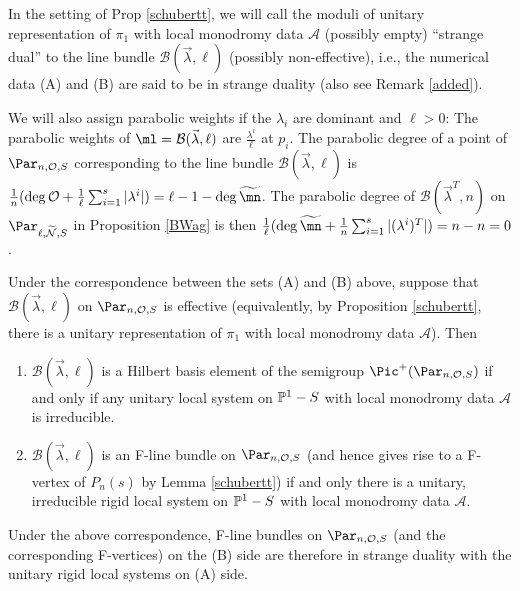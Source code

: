 \begin{defi}
\notready\label{Shosta}
In the setting of Prop \ref{schubertt}, we will call the moduli of unitary representation of $\pi_1$ with local monodromy data $\mathcal{A}$ (possibly empty)  ``strange dual'' to  the line bundle  $\mathcal{B}(\vec{\lambda},\ell)$ (possibly non-effective), i.e., the numerical data (A) and (B) are said to be in strange duality (also see Remark \ref{added}).

\end{defi}
\begin{defi}
\notready\label{amirK}
We will also assign parabolic weights if the $\lambda_i$ are dominant and $\ell>0$: The parabolic weights of $\ml=\mathcal{B}(\vec{\lambda},{\ell})$ are $\frac{{\lambda^i}}{\ell}$ at $p_i$. The parabolic degree of a point of $\Par_{n,\mathcal{O},S}$ corresponding to the line bundle  $\mathcal{B}(\vec{\lambda},{\ell})$ is $\frac{1}{n}(\deg{\mathcal{O}}+\frac{1}{\ell}\sum_{i=1}^s|\lambda^i|)=\ell-1-\deg\widetilde{\mn}$. The parabolic degree of $\mathcal{B}(\vec{\lambda}^T,n)$ on $\Par_{\ell,\widetilde{\mathcal{N}},S}$ in Proposition \ref{BWag} is then $\frac{1}{\ell}(\deg{\widetilde{\mn}}+\frac{1}{n}\sum_{i=1}^s|(\lambda^i)^T|) =n-n=0$.
\end{defi}

\begin{theorem}
\notready\label{christmas}
Under the correspondence between the sets (A) and (B) above, suppose that $\mathcal{B}(\vec{\lambda},\ell)$ on $\Par_{n,{\mathcal{O}},S}$ is effective (equivalently, by Proposition \ref{schubertt}, there is a unitary representation of $\pi_1$ with  local monodromy data $\mathcal{A}$). Then
\begin{enumerate}
\item[(i)] $\mathcal{B}(\vec{\lambda},\ell)$ is a Hilbert basis element of  the semigroup $\Pic^+(\Par_{n,\mathcal{O},S})$ if and only if
any unitary local system on $\Bbb{P}^1-S$ with local monodromy data $\mathcal{A}$ is  irreducible.
\item[(ii)] $\mathcal{B}(\vec{\lambda},\ell)$ is an F-line bundle on   $\Par_{n,\mathcal{O},S}$ (and hence gives rise to a F-vertex of $P_n(s)$ by Lemma \ref{schubertt}) if and only  there is a unitary, irreducible rigid local system on  $\Bbb{P}^1-S$ with local monodromy data $\mathcal{A}$.
\end{enumerate}
\end{theorem}
\begin{remark}
\notready\label{added}
Under the above correspondence,
F-line bundles on $\Par_{n,\mathcal{O},S}$ (and the corresponding F-vertices) on the (B) side are therefore in strange duality with the unitary rigid local systems on (A) side.
\end{remark}

